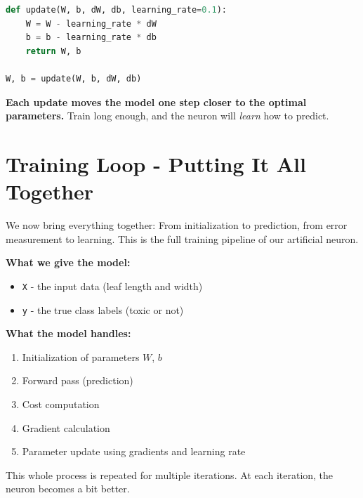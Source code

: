 \documentclass[11pt]{article}
\begin{document}
\begin{lstlisting}[language=Python]
def update(W, b, dW, db, learning_rate=0.1):
    W = W - learning_rate * dW
    b = b - learning_rate * db
    return W, b

W, b = update(W, b, dW, db)
\end{lstlisting}

\begin{tcolorbox}[colback=white!98!gray, colframe=gray!30!black, arc=1mm]
\textbf{Each update moves the model one step closer to the optimal parameters.}  
Train long enough, and the neuron will \textit{learn} how to predict.
\end{tcolorbox}

\section*{Training Loop - Putting It All Together}

\begin{tcolorbox}[colback=gray!5, colframe=black!50, title=Step 6: Learn from Experience, fonttitle=\bfseries, arc=2mm]
We now bring everything together:  
From initialization to prediction, from error measurement to learning.  
This is the full training pipeline of our artificial neuron.
\end{tcolorbox}

\vspace{1em}

\noindent\textbf{What we give the model:}
\begin{itemize}
    \item \texttt{X} - the input data (leaf length and width)
    \item \texttt{y} - the true class labels (toxic or not)
\end{itemize}

\noindent\textbf{What the model handles:}
\begin{enumerate}
    \item Initialization of parameters $W$, $b$
    \item Forward pass (prediction)
    \item Cost computation
    \item Gradient calculation
    \item Parameter update using gradients and learning rate
\end{enumerate}

\medskip

This whole process is repeated for multiple iterations.  
At each iteration, the neuron becomes a bit better.
\end{document}
